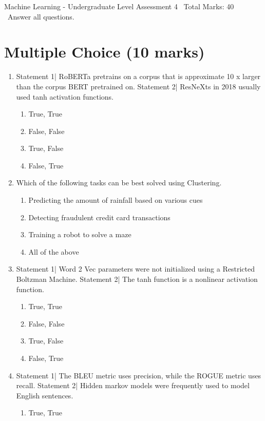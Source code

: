 \documentclass[12pt]{article}
\begin{document}
\begin{center}
Machine Learning - Undergraduate Level Assessment 4 \
Total Marks: 40 \
Answer all questions.
\end{center}

\section*{Multiple Choice (10 marks)}
\begin{enumerate}[label=\arabic*.]
\item Statement 1| RoBERTa pretrains on a corpus that is approximate 10 x larger than the corpus BERT pretrained on. Statement 2| ResNeXts in 2018 usually used tanh activation functions.
\begin{enumerate}[label=(\alph*)]
    \item True, True
    \item False, False
    \item True, False
    \item False, True
\end{enumerate}
\item Which of the following tasks can be best solved using Clustering.
\begin{enumerate}[label=(\alph*)]
    \item Predicting the amount of rainfall based on various cues
    \item Detecting fraudulent credit card transactions
    \item Training a robot to solve a maze
    \item All of the above
\end{enumerate}
\item Statement 1| Word 2 Vec parameters were not initialized using a Restricted Boltzman Machine. Statement 2| The tanh function is a nonlinear activation function.
\begin{enumerate}[label=(\alph*)]
    \item True, True
    \item False, False
    \item True, False
    \item False, True
\end{enumerate}
\item Statement 1| The BLEU metric uses precision, while the ROGUE metric uses recall. Statement 2| Hidden markov models were frequently used to model English sentences.
\begin{enumerate}[label=(\alph*)]
    \item True, True

\end{enumerate}
\end{enumerate}
\end{document}

